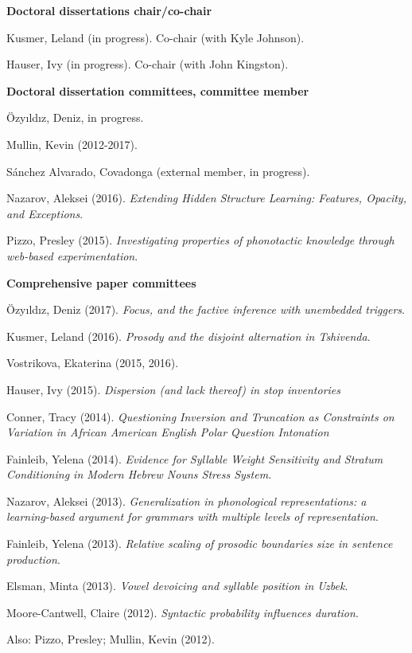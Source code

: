\documentclass[10pt]{article}
\newcommand{\halfblankline}{\quad\vspace{-0.5\baselineskip}\pagebreak[3]}
\begin{document}
\textbf{Doctoral dissertations chair/co-chair} \hfill 

\begin{innerlist}
    \item Kusmer, Leland (in progress). Co-chair (with Kyle Johnson).
    \item Hauser, Ivy (in progress). Co-chair (with John Kingston).
\end{innerlist}

\halfblankline

\textbf{Doctoral dissertation committees, committee member} \hfill 

\begin{innerlist}
    \item \"{O}zy\i{}ld\i{}z, Deniz, in progress.
    \item Mullin, Kevin (2012-2017).
    \item S\'anchez Alvarado, Covadonga (external member, in progress).
    \item Nazarov, Aleksei (2016). \emph{Extending Hidden Structure Learning: Features, Opacity, and Exceptions}.
    \item Pizzo, Presley (2015). \emph{Investigating properties of
        phonotactic knowledge through web-based experimentation}.
\end{innerlist}

\halfblankline

\textbf{Comprehensive paper committees} \hfill 

\begin{innerlist}
  \item \"{O}zy\i{}ld\i{}z, Deniz (2017). \emph{Focus, and the factive inference with unembedded triggers}.
    \item Kusmer, Leland (2016). \emph{Prosody and the disjoint alternation in Tshivenda}. 
    \item Vostrikova, Ekaterina (2015, 2016). 
    \item Hauser, Ivy (2015). \emph{Dispersion (and lack thereof) in stop inventories}
    \item Conner, Tracy (2014). \emph{Questioning Inversion and
        Truncation as Constraints on Variation in African American English Polar Question Intonation}
    \item Fainleib, Yelena (2014). \emph{Evidence for Syllable Weight Sensitivity and Stratum Conditioning in Modern Hebrew Nouns Stress System.}
    \item Nazarov, Aleksei (2013). \emph{Generalization in phonological representations: a learning-based argument for grammars with multiple levels of representation}.
    \item Fainleib, Yelena (2013). \emph{Relative scaling of prosodic boundaries size in sentence production}. 
    \item Elsman, Minta (2013). \emph{Vowel devoicing and syllable position in Uzbek}.
    \item Moore-Cantwell, Claire (2012). \emph{Syntactic probability
        influences duration}.
    \item Also: Pizzo, Presley; Mullin, Kevin (2012).
\end{innerlist}
\end{document}
